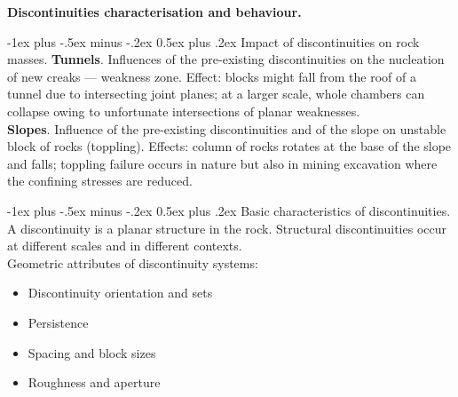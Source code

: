 \documentclass[10pt,landscape,a4paper]{article}
\makeatletter
\newcounter{Chapcounter}
\newcommand{\chapter}[1]{{\addtocounter{Chapcounter}{1}\fontsize{17}{16}\textbf{#1}}}
\renewcommand{\section}{\@startsection{section}{1}{0mm}%
	{-1ex plus -.5ex minus -.2ex}%
	{0.5ex plus .2ex}%
	{\normalfont\large\bfseries}}
\makeatother
\begin{document}
\begin{multicols}{3}
	\chapter{Discontinuities characterisation and behaviour.}
	
	\section{Impact of discontinuities on rock masses.}
	\textbf{Tunnels}.
	Influences of the pre-existing discontinuities on the nucleation of new creaks --- weakness zone.
	Effect: blocks might fall from the roof of a tunnel due to intersecting joint planes; at a larger scale, whole chambers can collapse owing to unfortunate intersections of planar weaknesses.\\
	\textbf{Slopes}.
	Influence of the pre-existing discontinuities and of the slope on unstable block of rocks (toppling).
	Effects: column of rocks rotates at the base of the slope and falls; toppling failure occurs in nature but also in mining excavation where the confining stresses are reduced.
	
	\section{Basic characteristics of discontinuities.}
	A discontinuity is a planar structure in the rock.
	Structural discontinuities occur at different scales and in different contexts.\\
	Geometric attributes of discontinuity systems:
	\begin{itemize}
		\item Discontinuity orientation and sets
		\item Persistence
		\item Spacing and block sizes
		\item Roughness and aperture
	\end{itemize}
	

\end{multicols}
\end{document}
